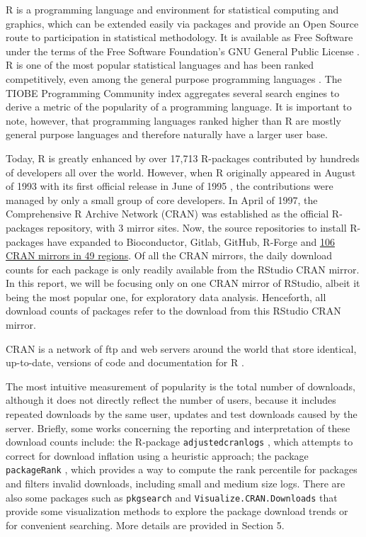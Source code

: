 \documentclass[
]{book}
\begin{document}
R is a programming language and environment for statistical computing and graphics, which can be extended easily via packages and provide an Open Source route to participation in statistical methodology. It is available as Free Software under the terms of the Free Software Foundation's GNU General Public License \autocite{gnu}. R is one of the most popular statistical languages and has been ranked competitively, even among the general purpose programming languages \autocite[peaking 8th in August 2020 in][]{tiobe}. The TIOBE Programming Community index aggregates several search engines to derive a metric of the popularity of a programming language. It is important to note, however, that programming languages ranked higher than R are mostly general purpose languages and therefore naturally have a larger user base.

Today, R is greatly enhanced by over 17,713 R-packages contributed by hundreds of developers all over the world. However, when R originally appeared in August of 1993 with its first official release in June of 1995 \autocite{Ikaha1998}, the contributions were managed by only a small group of core developers. In April of 1997, the Comprehensive R Archive Network (CRAN) was established as the official R-packages repository, with 3 mirror sites. Now, the source repositories to install R-packages have expanded to Bioconductor, Gitlab, GitHub, R-Forge and \href{https://cran.r-project.org/mirmon_report.html}{106 CRAN mirrors in 49 regions}. Of all the CRAN mirrors, the daily download counts for each package is only readily available from the RStudio CRAN mirror. In this report, we will be focusing only on one CRAN mirror of RStudio, albeit it being the most popular one, for exploratory data analysis. Henceforth, all download counts of packages refer to the download from this RStudio CRAN mirror.

CRAN is a network of ftp and web servers around the world that store identical, up-to-date, versions of code and documentation for R \autocite{CRAN}.

The most intuitive measurement of popularity is the total number of downloads, although it does not directly reflect the number of users, because it includes repeated downloads by the same user, updates and test downloads caused by the server. Briefly, some works concerning the reporting and interpretation of these download counts include: the R-package \texttt{adjustedcranlogs} \autocite{adjustedcranlogs}, which attempts to correct for download inflation using a heuristic approach; the package \texttt{packageRank} \autocite{packageRank}, which provides a way to compute the rank percentile for packages and filters invalid downloads, including small and medium size logs. There are also some packages such as \texttt{pkgsearch}\autocite{pkgsearch} and \texttt{Visualize.CRAN.Downloads}\autocite{VisualizeCRANDownloads} that provide some visualization methods to explore the package download trends or for convenient searching. More details are provided in Section 5.
\end{document}
